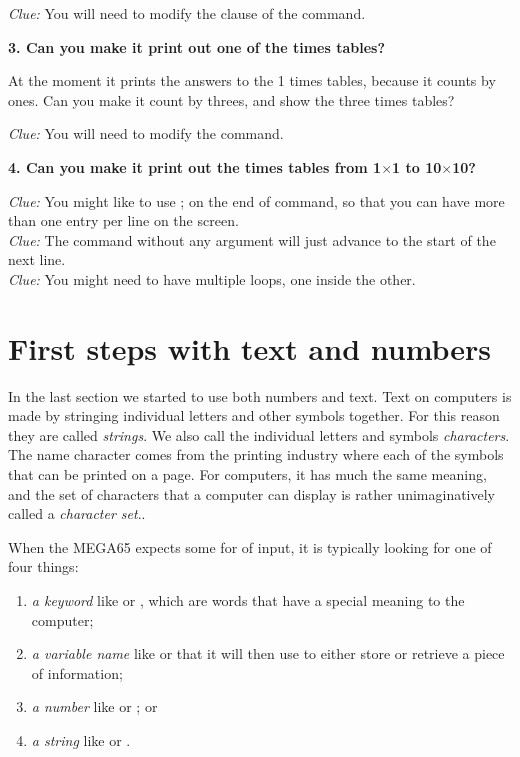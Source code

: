   {\em Clue:} You will need to modify the  clause
  of the  command.


  {\bf 3. Can you make it print out one of the times tables?}

  At the moment it prints the answers to the 1 times tables, because it counts by ones.
  Can you make it count by threes, and show the three times tables?

  {\em Clue:} You will need to modify the  command.

  {\bf 4. Can you make it print out the times tables from 1$\times$1 to 10$\times$10?}

  {\em Clue:} You might like to use ; on the end of  command, so that you can have
  more than one entry per line on the screen.\\
  {\em Clue:} The  command without any argument will just advance to the start of the next line.\\
  {\em Clue:} You might need to have multiple  loops, one inside the other.

\section{First steps with text and numbers}

In the last section we started to use both numbers and text.  Text on computers is made by stringing individual letters
and other symbols together.  For this reason they are called {\em strings}.  We also call the individual letters and
symbols {\em characters}.  The name character comes from the printing industry where each of the symbols that can be
printed on a page. For computers, it has much the same meaning, and the set of characters that a computer can display
is rather unimaginatively called a {\em character set}..

When the MEGA65 expects some for of input, it is typically looking for one of four things:

\begin{enumerate}
\item {\em a keyword} like  or , which are words that have a special meaning to the computer;
\item {\em a variable name} like  or  that it will then use to either store or retrieve a piece of information;
\item {\em a number} like  or ; or
\item {\em a string} like  or .
\end{enumerate}

